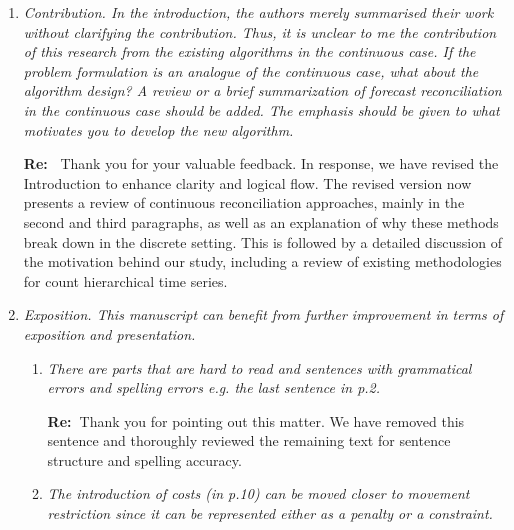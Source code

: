 \documentclass[11pt,a4paper]{article}
\newcommand{\RE}[2][Re:~]{{\color{blue}\textbf{#1}#2}}
\begin{document}
\begin{enumerate}
\begin{enumerate}
    \RE{Thank you for your suggestion. As mentioned in your previous comment, we have added Table~5 to illustrate the relationship between the hierarchy size and computational time. Here, we show that for many of our examples, the computational cost is not prohibitive, taking 5 minutes for one of our empirical applications and 25 minutes for the other (the simulation studies are computed almost instantly). Furthermore, although reconciliation methods do not always outperform simpler benchmarks (which we reiterate are special cases of our new framework), in almost all our examples, DFR or SDFR significantly outperforms the base forecasts.}


  \end{enumerate}

\item \textit{Contribution. In the introduction, the authors merely summarised their work without clarifying the contribution. Thus, it is unclear to me the contribution of this research from the existing algorithms in the continuous case. If the problem formulation is an analogue of the continuous case, what about the algorithm design? A review or a brief summarization of forecast reconciliation in the continuous case should be added. The emphasis should be given to what motivates you to develop the new algorithm.}

\RE{
  Thank you for your valuable feedback. In response, we have revised the Introduction to enhance clarity and logical flow. The revised version now presents a review of continuous reconciliation approaches, mainly in the second and third paragraphs, as well as an explanation of why these methods break down in the discrete setting. This is followed by a detailed discussion of the motivation behind our study, including a review of existing methodologies for count hierarchical time series.
}


\item \textit{Exposition. This manuscript can benefit from further improvement in terms of exposition and presentation. }
\begin{enumerate}
    \item \textit{There are parts that are hard to read and sentences with grammatical errors and spelling errors e.g. the last sentence in p.2.}
    
    \RE{Thank you for pointing out this matter. We have removed this sentence and thoroughly reviewed the remaining text for sentence structure and spelling accuracy.}
    \item \textit{The introduction of costs (in p.10) can be moved closer to movement restriction since it can be represented either as a penalty or a constraint.}
    

\end{enumerate}
\end{enumerate}
\end{document}
